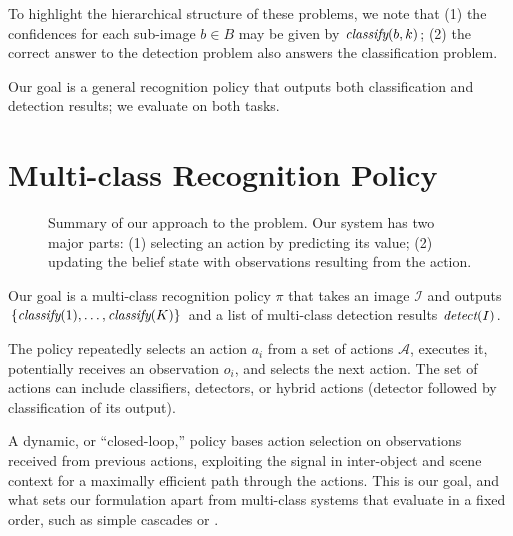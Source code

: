 To highlight the hierarchical structure of these problems, we note that (1) the confidences for each sub-image $b \in B$ may be given by $\emph{classify}(b,k)$; (2) the correct answer to the detection problem also answers the classification problem. 

Our goal is a general recognition policy that outputs both classification and detection results; we evaluate on both tasks.

\section{Multi-class Recognition Policy}
\begin{figure}[h!]
  \caption{Summary of our approach to the problem. Our system has two major parts: (1) selecting an action by predicting its value; (2) updating the belief state with observations resulting from the action.}
  \label{fig:evaluation}
\end{figure}

Our goal is a multi-class recognition policy $\pi$ that takes an image $\mathcal{I}$ and outputs $\{\emph{classify}(1), \dots, \emph{classify}(K)\}$ and a list of multi-class detection results $\emph{detect}(I)$.

The policy repeatedly selects an action $a_i$ from a set of actions $\mathcal{A}$, executes it, potentially receives an observation $o_i$, and selects the next action.
The set of actions can include classifiers, detectors, or hybrid actions (detector followed by classification of its output).

A dynamic, or ``closed-loop,'' policy bases action selection on observations received from previous actions, exploiting the signal in inter-object and scene context for a maximally efficient path through the actions.
This is our goal, and what sets our formulation apart from multi-class systems that evaluate in a fixed order, such as simple cascades \cite{Viola2001} or .

